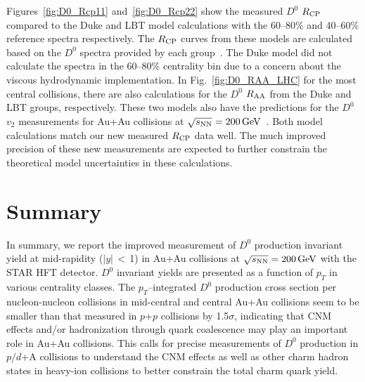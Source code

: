 \documentclass[%
 reprint,	
showpacs,
 amsmath,amssymb,
 aps,
 prc,
]{revtex4-1}
\begin{document}
Figures~\ref{fig:D0_Rcp11} and~\ref{fig:D0_Rcp22} show the measured $D^0$ $R_{\rm CP}$ compared to the Duke and LBT model calculations with the 60--80\% and 40--60\% reference spectra respectively. The $R_{\rm CP}$ curves from these models are calculated based on the $D^0$ spectra provided by each group~\cite{Cao:2016gvr,LBT:private,Xu:2017obm}. The Duke model did not calculate the spectra in the 60--80\% centrality bin due to a concern about the viscous hydrodynamic implementation. In Fig.~\ref{fig:D0_RAA_LHC} for the most central collisions, there are also calculations for the $D^0$ $R_{\rm AA}$ from the Duke and LBT groups, respectively. These two models also have the predictions for the $D^0$ $v_2$ measurements for Au+Au collisions at ${\sqrt{s_{\rm NN}} = \rm{200\,GeV}}$~\cite{Star_D_v2}. %
Both model calculations match our new measured $R_{\rm CP}$ data well. The much improved precision of these new measurements are expected to further constrain the theoretical model uncertainties in these calculations.


\section{Summary}
\label{summary}

In summary, we report the improved measurement of $D^0$ production invariant yield at mid-rapidity ($|y|$\,$<$\,1) in Au+Au collisions at ${\sqrt{s_{\rm NN}} = \rm{200\,GeV}}$ with the STAR HFT detector.\,\,$D^0$ invariant yields are presented as a function of $p_{T}$ in various centrality classes.\,\,The $p_{T}$--integrated $D^0$ production cross section per nucleon-nucleon collisions in mid-central and central Au+Au collisions seem to be smaller than that measured in $p$+$p$ collisions by 1.5$\sigma$, indicating that CNM effects and/or hadronization through quark coalescence may play an important role in Au+Au collisions. This calls for precise measurements of $D^0$ production in $p/d$+A collisions to understand the CNM effects as well as other charm hadron states in heavy-ion collisions to better constrain the total charm quark yield. 
\end{document}

